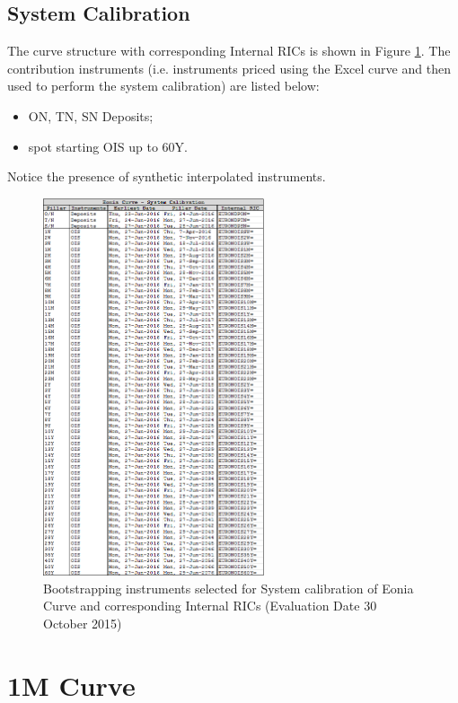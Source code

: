 \subsection{System Calibration}

The curve structure with corresponding Internal RICs is shown in Figure \ref{fig:ONMx}. The contribution instruments (i.e. instruments priced using the Excel curve and then used to perform the system calibration) are listed below:
\begin{itemize}
\item ON, TN, SN Deposits;
\item spot starting OIS up to 60Y.
\end{itemize}
Notice the presence of synthetic interpolated instruments.

\begin{figure}
\centering
\includegraphics[width=0.58\textwidth]{images/ONMx.png}
\caption{Bootstrapping instruments selected for System calibration of Eonia Curve and corresponding Internal RICs (Evaluation Date 30 October 2015)}
\label{fig:ONMx}
\end{figure}

\section{1M Curve}

